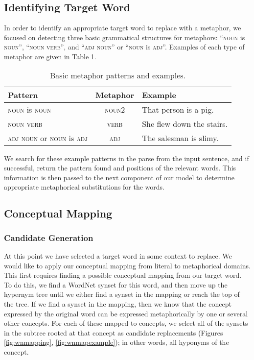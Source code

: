 \documentclass[12pt]{article}
\begin{document}
\subsection{Identifying Target Word}
\label{sec:identtarget}
In order to identify an appropriate target word to replace with a metaphor, we focused on detecting three basic grammatical structures for metaphors: ``\textsc{noun} is \textsc{noun}'', ``\textsc{noun} \textsc{verb}'', and ``\textsc{adj} \textsc{noun}'' or ``\textsc{noun} is \textsc{adj}''.  Examples of each type of metaphor are given in Table \ref{tab:metaphorexamples}.

\begin{table}[h]
	\centering
	\small
	\begin{tabular}{|l|c|l|} \hline
		\textbf{Pattern} & \textbf{Metaphor} & \textbf{Example}\\	\hline
		\textsc{noun} is \textsc{noun} & \textsc{noun2} & That person is a pig.\\ \hline
		\textsc{noun} \textsc{verb} & \textsc{verb} & She flew down the stairs.\\ \hline
		\textsc{adj} \textsc{noun} or \textsc{noun} is \textsc{adj} & \textsc{adj} & The salesman is slimy.\\ \hline
	\end{tabular}
	\caption{Basic metaphor patterns and examples.}
	\label{tab:metaphorexamples}
\end{table}

We search for these example patterns in the parse from the input sentence, and if successful, return the pattern found and positions of the relevant words.  This information is then passed to the next component of our model to determine appropriate metaphorical substitutions for the words.

\subsection{Conceptual Mapping}

\subsubsection{Candidate Generation}

At this point we have selected a target word in some context to replace. We would like to apply our conceptual mapping from literal to metaphorical domains. This first requires finding a possible conceptual mapping from our target word. To do this, we find a WordNet synset for this word, and then move up the hypernym tree until we either find a synset in the mapping or reach the top of the tree. If we find a synset in the mapping, then we know that the concept expressed by the original word can be expressed metaphorically by one or several other concepts. For each of these mapped-to concepts, we select all of the synsets in the subtree rooted at that concept as candidate replacements (Figures \ref{fig:wnmapping}, \ref{fig:wnmapexample}); in other words, all hyponyms of the concept.
\end{document}

